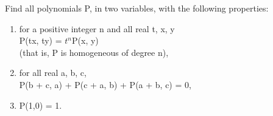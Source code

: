 

\item Find all polynomials P, in two variables, with the following properties:
\begin{enumerate}
\item  for a positive integer n and all real t, x, y\\
P(tx, ty) = $t^n$P(x, y)\\
(that is, P is homogeneous of degree n),
\item  for all real a, b, c, 
\\P(b + c, a) + P(c + a, b) + P(a + b, c) = 0,
\item  P(1,0) = 1.
\end{enumerate}


